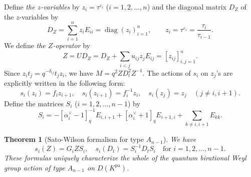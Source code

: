 \documentclass[12pt,twoside]{article}
\newcommand\av{\alpha^\vee}
\newcommand\eps{\varepsilon}
\newcommand\pa{{\mathrm{pa}}}
\newcommand\diag{\mathop{\mathrm{diag}}\nolimits}
\theoremstyle{plain} %
\newtheorem{theorem}{Theorem}
\theoremstyle{definition} %
\theoremstyle{definition} %
\numberwithin{theorem}{section}
\numberwithin{equation}{section}
\numberwithin{figure}{section}
\numberwithin{table}{section}
\begin{document}
Define {\em the $z$-variables} by $z_i = \tau^{\eps_i}$ ($i=1,2,\ldots,n$) 
and the diagonal matrix $D_Z$ of the $z$-variables by
\begin{equation*}
 D_Z = \sum_{i=1}^n z_i E_{ii} = \diag(z_i)_{i=1}^n,
 \qquad z_i = \tau^{\eps_i} = \frac{\tau_i}{\tau_{i-1}}.
\end{equation*}
We define {\em the $Z$-operator} by
\begin{equation*}
 Z = U D_Z = D_Z + \sum_{i<j} u_{ij}z_j E_{ij} = [z_{ij}]_{i,j=1}^n.
\end{equation*}
Since $z_i t_j = q^{-\delta_{ij}} t_j z_i$, 
we have $M = q^2 Z D_t^2 Z^{-1}$. 
The actions of $s_i$ on $z_j$'s are explicitly written in the following form:
\begin{equation}
 s_i(z_i)= f_i z_{i+1}, \quad
 s_i(z_{i+1}) = f_i^{-1} z_i, \quad
 s_i(z_j) = z_j \quad (j\ne i,i+1).
 \label{eq:s_i(z_j)}
\end{equation}
Define the matrices $S_i$ ($i=1,2,\ldots,n-1$) by
\begin{equation*}
 S_i = 
 -[\av_i-1]_q^{-1} E_{i,i+1} + [\av_i+1]_q E_{i+1,i}
 + \sum_{k\ne i,i+1} E_{kk}.
\end{equation*}

\begin{theorem}[Sato-Wilson formalism for type $A_{n-1}$]
\label{theorem:Sato-Wilson-A_{n-1}}
 We have
 \begin{equation}
  s_i(Z) = G_i Z S_i, \quad 
  s_i(D_t) = S_i^{-1} D_t S_i 
  \quad \text{for $i=1,2,\ldots,n-1$}.
  \label{eq:s_i(Z)}
 \end{equation}
 These formulas uniquely characterize the whole of 
 the quantum birational Weyl group action of type $A_{n-1}$
 on $D(K^\pa)$.
\end{theorem}
\end{document}
